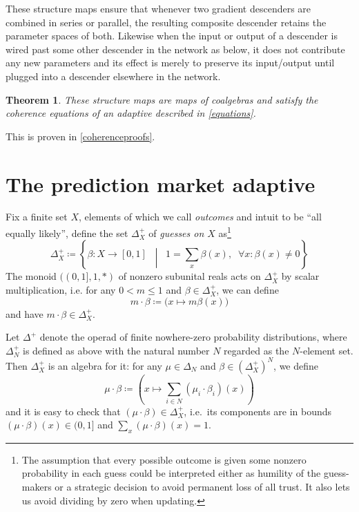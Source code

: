 \documentclass[11pt, one side, article]{memoir}
\theoremstyle{definition}
\theoremstyle{plain}
\newtheorem{theorem}[definitionx]{Theorem}
\newcommand{\0}{\textsf{0}}
\newcommand{\1}{\tn{\textsf{1}}}
\newcommand{\bet}{\Delta^+}
\begin{document}
These structure maps ensure that whenever two gradient descenders are combined in series or parallel, the resulting composite descender retains the parameter spaces of both. Likewise when the input or output of a descender is wired past some other descender in the network as below, %
it does not contribute any new parameters and its effect is merely to preserve its input/output until plugged into a descender elsewhere in the network.


\begin{theorem}\label{gradientadaptive}
These structure maps are maps of coalgebras and satisfy the coherence equations of an adaptive described in \cref{equations}.
\end{theorem}

This is proven in \cref{coherenceproofs}.


\section{The prediction market adaptive}\label{sec.kelley}


Fix a finite set $X$, elements of which we call \emph{outcomes} and intuit to be ``all equally likely'', define the set $\bet_X$ of \emph{guesses on $X$} as\footnote{The assumption that every possible outcome is given some nonzero probability in each guess could be interpreted either as humility of the guess-makers or a strategic decision to avoid permanent loss of all trust. It also lets us avoid dividing by zero when updating.}
\[
	\bet_X\coloneqq\left\{\beta\colon X\to[0,1]\;\;\middle|\;\;1=\sum_x\beta(x), \;\; \forall x\colon \beta(x) \neq 0 \right\}
\]
The monoid $((0,1],1,*)$ of nonzero subunital reals acts on $\bet_X$ by scalar multiplication, i.e. for any $0 < m\leq 1$ and $\beta\in\bet_X$, we can define
\[
	m\cdot \beta\coloneqq \big(x\mapsto m\beta (x)\big)
\]
and have $m\cdot\beta\in\bet_X$. 

Let $\Delta^+$ denote the operad of finite nowhere-zero probability distributions, where $\Delta^+_N$ is defined as above with the natural number $N$ regarded as the $N$-element set. %
Then $\bet_X$ is an algebra for it: for any $\mu\in\Delta_N$ and $\beta \in (\bet_X)^N$, we define 
\[
	\mu\cdot\beta\coloneqq\left(x\mapsto\sum_{i\in N}(\mu_i\cdot\beta_i)(x)\right)
\]
and it is easy to check that $(\mu\cdot\beta)\in\bet_X$, i.e.\ its components are in bounds $(\mu\cdot\beta)(x)\in (0,1]$ and $\sum_x(\mu\cdot\beta)(x)=1$.
\end{document}
